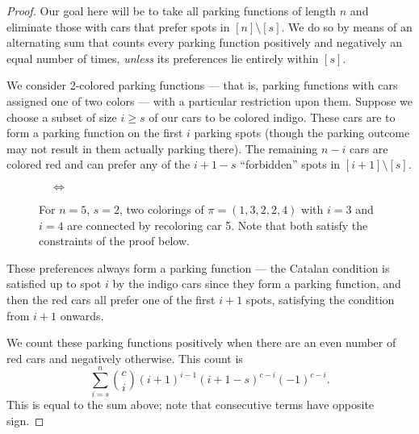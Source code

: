 \documentclass[12 pt]{amsart}
\theoremstyle{definition} %
\theoremstyle{remark} %
\newcommand{\mzncar}[3][(0,0)]{
\begin{scope}[shift={#1}]
\shade[top color=#2, bottom color=#3, shading angle=90, draw=white, rounded corners=0.7ex, very thick] (0.75,.25) -- ++(0,0.5) -- ++(0.5,0.15) -- ++(1.5,0) -- ++(0.5,0) -- ++(0,-0.65) -- (0.75,.25) -- cycle;
\draw[thick, rounded corners=0.2ex, fill=white, thick] (1.25,0.85) -- ++(0.5,0.35) -- ++(0.8,0) -- ++(0.3,-0.35) -- (1.25,0.85);
\draw[thick] (2.1,0.85) -- (2.1,1.2);
\draw[fill=gray!80,thin] (1.375,.25) circle[radius=.2];
\draw[fill=gray!80,thin] (2.76,.25) circle[radius=.2];
\end{scope}
}
\begin{document}
\begin{proof}
    Our goal here will be to take all parking functions of length $n$ and eliminate those with cars that prefer spots in $[n] \setminus [s]$. We do so by means of an alternating sum that counts every parking function positively and negatively an equal number of times, \textit{unless} its preferences lie entirely within $[s].$

	We consider 2-colored parking functions --- that is, parking functions with cars assigned one of two colors --- with a particular restriction upon them.  Suppose we choose a subset of size $i \ge s$ of our cars to be colored indigo. These cars are to form a parking function on the first $i$ parking spots (though the parking outcome may not result in them actually parking there). The remaining $n - i$ cars are colored red and can prefer any of the $i + 1 - s$ ``forbidden'' spots in  $[i + 1] \setminus [s]$.
    
\begin{figure}
\begin{center}
 $\quad \Longleftrightarrow \quad$
\end{center}
\caption{For $n=5$, $s = 2$, two colorings of $\pi = (1,3,2,2,4)$ with $i = 3$ and $i = 4$ are connected by recoloring car 5. Note that both satisfy the constraints of the proof below.}
\end{figure}
    
    These preferences always form a parking function --- the Catalan condition is satisfied up to spot $i$ by the indigo cars since they form a parking function, and then the red cars all prefer one of the first $i + 1$ spots, satisfying the condition from $i+1$ onwards.
    
    We count these parking functions positively when there are an even number of red cars and negatively otherwise. This count is
	\[
		\sum_{i = s}^{n} \binom{c}{i} (i + 1)^{i - 1} (i + 1 - s)^{c - i} (-1)^{c - i}.
	\]
	This is equal to the sum above; note that consecutive terms have opposite sign.


\end{proof}
\end{document}
